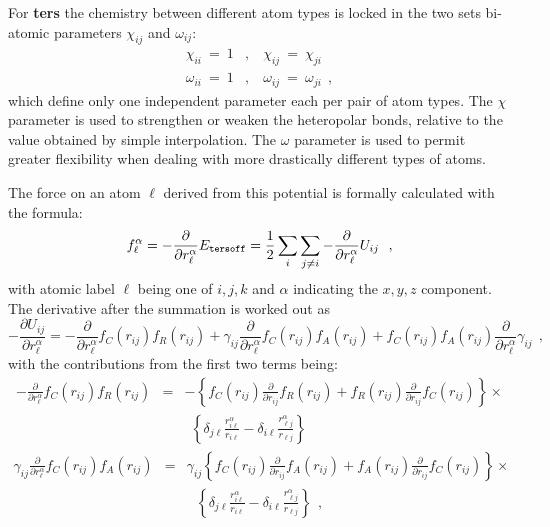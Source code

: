 For {\bf ters} the chemistry between different atom types is locked in
the two sets bi-atomic parameters $\chi_{ij}$ and $\omega_{ij}$:
\begin{eqnarray}
\chi_{ii}~=~1&,&~\chi_{ij}~=~\chi_{ji} \nonumber \\
\omega_{ii}~=~1&,&~\omega_{ij}~=~\omega_{ji}~~,
\end{eqnarray}
which define only one independent parameter each per pair of atom
types.  The $\chi$ parameter is used to strengthen or weaken the
heteropolar bonds, relative to the value obtained by simple
interpolation.  The $\omega$ parameter is used to permit greater
flexibility when dealing with more drastically different types of
atoms.

The force on an atom $\ell$ derived from this potential is
formally calculated with the formula:
\begin{equation}
f_{\ell}^{\alpha} = -\frac{\partial}{\partial r_{\ell}^{\alpha}}
E_{\tt tersoff} = \frac{1}{2} \sum_{i}\sum_{j \neq i}
-\frac{\partial}{\partial r_{\ell}^{\alpha}} U_{ij}~~,
\end{equation}
with atomic label $\ell$ being one of $i,j,k$ and $\alpha$
indicating the $x,y,z$ component.  The derivative after the
summation is worked out as
\begin{equation}
-\frac{\partial U_{ij}}{\partial r_{\ell}^{\alpha}} =
-\frac{\partial}{\partial r_{\ell}^{\alpha}} f_{C}(r_{ij}) f_{R}(r_{ij}) +
 \gamma_{ij} \frac{\partial}{\partial r_{\ell}^{\alpha}} f_{C}(r_{ij}) f_{A}(r_{ij}) +
 f_{C}(r_{ij}) f_{A}(r_{ij}) \frac{\partial}{\partial r_{\ell}^{\alpha}} \gamma_{ij}~~,
\end{equation}
with the contributions from the first two terms being:
\begin{eqnarray}
-\frac{\partial}{\partial r_{\ell}^{\alpha}} f_{C}(r_{ij}) f_{R}(r_{ij})&=&
-\left\{ f_{C}(r_{ij}) \frac{\partial}{\partial r_{ij}} f_{R}(r_{ij}) +
f_{R}(r_{ij}) \frac{\partial}{\partial r_{ij}} f_{C}(r_{ij}) \right\} \times \nonumber \\
& & ~~\left\{ \delta_{j \ell} \frac{r_{i \ell}^{\alpha}}{r_{i \ell}} -
\delta_{i \ell} \frac{r_{\ell j}^{\alpha}}{r_{\ell j}} \right\}
\end{eqnarray}
\begin{eqnarray}
\gamma_{ij} \frac{\partial}{\partial r_{\ell}^{\alpha}} f_{C}(r_{ij}) f_{A}(r_{ij})&=&
\gamma_{ij} \left\{ f_{C}(r_{ij}) \frac{\partial}{\partial r_{ij}} f_{A}(r_{ij}) +
f_{A}(r_{ij}) \frac{\partial}{\partial r_{ij}} f_{C}(r_{ij}) \right\} \times \nonumber \\
& & ~~~\left\{ \delta_{j \ell} \frac{r_{i \ell}^{\alpha}}{r_{i \ell}} -
\delta_{i \ell} \frac{r_{\ell j}^{\alpha}}{r_{\ell j}} \right\}~~,
\end{eqnarray}

